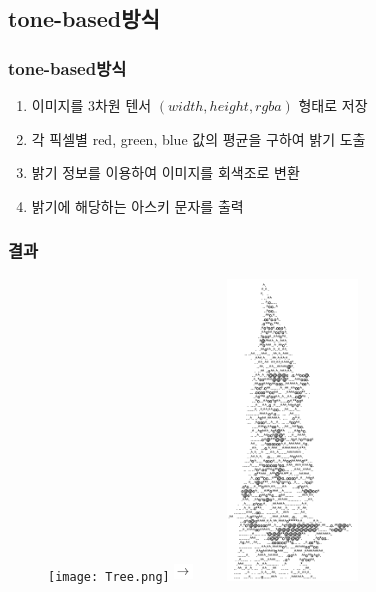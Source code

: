 \documentclass{beamer}
\newcommand{\spacing}{\hspace{0.3em}}
\newcommand{\tonebased}{\textbf{tone-based}}
\begin{document}
	\subsection{\tonebased \spacing 방식}
	\begin{frame}{}
		\frametitle{\tonebased \spacing 방식}
		\begin{enumerate}
			\item 이미지를 3차원 텐서 $ ( width, height, rgba ) $ 형태로 저장
			\item 각 픽셀별 red, green, blue 값의 평균을 구하여 밝기 도출
			\item 밝기 정보를 이용하여 이미지를 회색조로 변환
			\item 밝기에 해당하는 아스키 문자를 출력
		\end{enumerate}
	\end{frame}
	\begin{frame}
		\frametitle{결과}
			\begin{figure}
			\centering
			\texttt{[image: Tree.png]}
			\includegraphics[align=c, width=0.5cm, height=0.5cm]{Rightarrow.png}
			\includegraphics[align=c, width=5cm, height=8cm]{TreeToneBased.png}
			\end{figure}
	\end{frame}
\end{document}
